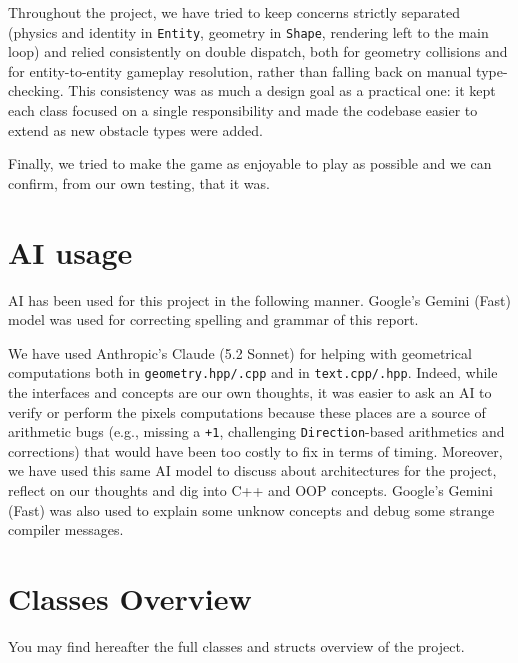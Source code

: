 \documentclass{article}
\begin{document}
Throughout the project, we have tried to keep concerns strictly separated (physics and identity in \texttt{Entity}, geometry in \texttt{Shape}, rendering left to the main loop) and relied consistently on double dispatch, both for geometry collisions and for entity-to-entity gameplay resolution, rather than falling back on manual type-checking. This consistency was as much a design goal as a practical one: it kept each class focused on a single responsibility and made the codebase easier to extend as new obstacle types were added.

Finally, we tried to make the game as enjoyable to play as possible and we can confirm, from our own testing, that it was.

\appendix{}

\section{AI usage} \label{apx: ai_usage}

AI has been used for this project in the following manner. Google's Gemini (Fast) model was used for correcting spelling and grammar of this report.

We have used Anthropic's Claude (5.2 Sonnet) for helping with geometrical computations both in \texttt{geometry.hpp/.cpp} and in \texttt{text.cpp/.hpp}. Indeed, while the interfaces and concepts are our own thoughts, it was easier to ask an AI to verify or perform the pixels computations because these places are a source of arithmetic bugs (e.g., missing a \texttt{+1}, challenging \texttt{Direction}-based arithmetics and corrections) that would have been too costly to fix in terms of timing. Moreover, we have used this same AI model to discuss about architectures for the project, reflect on our thoughts and dig into C++ and OOP concepts. Google's Gemini (Fast) was also used to explain some unknow concepts and debug some strange compiler messages.

\section{Classes Overview} \label{apx: overview}

You may find hereafter the full classes and structs overview of the project.


\end{document}
